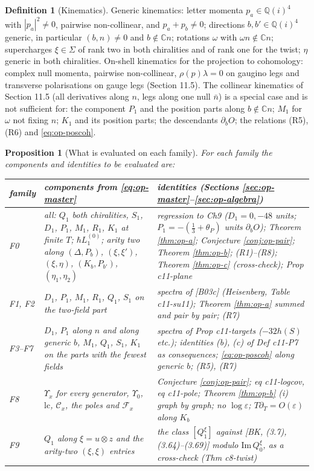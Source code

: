\documentclass[11pt]{article}
\numberwithin{equation}{section}
\theoremstyle{plain}
\newtheorem{proposition}[theorem]{Proposition}
\theoremstyle{definition}
\newtheorem{definition}[theorem]{Definition}
\newcommand{\lc}{\mathrm{lc}}
\newcommand{\Comp}{\mathcal C}
\begin{document}
\begin{definition}[Kinematics]
\label{def:op-kin}
Generic kinematics: letter momenta $p_a\in\mathbb Q(i)^4$ with $|p_a|^2\ne0$, pairwise non-collinear, and $p_a+p_b\ne0$; directions $b,b'\in\mathbb Q(i)^4$ generic, in particular $(b,n)\ne0$ and $b\notin\mathbb C n$; rotations $\omega$ with $\omega n\notin\mathbb Cn$; supercharges $\xi\in\Sigma$ of rank two in both chiralities and of rank one for the twist; $\eta$ generic in both chiralities. On-shell kinematics for the projection to cohomology: complex null momenta, pairwise non-collinear, $\rho(p)\lambda=0$ on gaugino legs and transverse polarisations on gauge legs (Section 11.5). The collinear kinematics of Section 11.5 (all derivatives along $n$, legs along one null $\bar n$) is a special case and is not sufficient for: the component $P_1$ and the position parts along $b\notin\mathbb Cn$; $M_1$ for $\omega$ not fixing $n$; $K_1$ and its position parts; the descendants $\partial_bO$; the relations (R5), (R6) and \eqref{eq:op-poscoh}.
\end{definition}

\begin{proposition}[What is evaluated on each family]
\label{prop:op-famtable}
For each family the components and identities to be evaluated are:
\begin{center}
\begin{tabular}{l|p{6.4cm}|p{6.4cm}}
family & components from \eqref{eq:op-master} & identities (Sections \ref{sec:op-master}--\ref{sec:op-algebra})\\
\hline
F0 & all: $Q_1$ both chiralities, $S_1$, $D_1$, $P_1$, $M_1$, $R_1$, $K_1$ at finite $T$; $\hbar L_1^{(0)}$; arity two along $(\Delta,P_b)$, $(\xi,\xi')$, $(\xi,\eta)$, $(K_b,P_{b'})$, $(\eta_1,\eta_2)$ & regression to Ch9 ($D_1=0,-48$ units; $P_1=-(\tfrac13+\theta_P)$ units $\partial_bO$); Theorem \ref{thm:op-a}; Conjecture \ref{conj:op-pair}; Theorem \ref{thm:op-b}; (R1)--(R8); Theorem \ref{thm:op-c} (cross-check); Prop c11-plane\\
F1, F2 & $D_1$, $P_1$, $M_1$, $R_1$, $Q_1$, $S_1$ on the two-field part & spectra of [B03c] (Heisenberg, Table c11-su11); Theorem \ref{thm:op-a} summed and pair by pair; (R7)\\
F3--F7 & $D_1$, $P_1$ along $n$ and along generic $b$, $M_1$, $Q_1$, $S_1$, $K_1$ on the parts with the fewest fields & spectra of Prop c11-targets ($-32h(S)$ etc.); identities (b), (c) of Def c11-P7 as consequences; \eqref{eq:op-poscoh} along generic $b$; (R5), (R7)\\
F8 & $\Upsilon_x$ for every generator, $\Upsilon_0$, $\lc$, $\Comp_x$, the poles and $\mathcal F_x$ & Conjecture \ref{conj:op-pair}; eq c11-logcov, eq c11-pole; Theorem \ref{thm:op-b} (i) graph by graph; no $\log\varepsilon$; $T\partial_T=O(\varepsilon)$ along $K_b$\\
F9 & $Q_1$ along $\xi=u\otimes z$ and the arity-two $(\xi,\xi)$ entries & the class $[Q^\xi_1]$ against [BK, (3.7), (3.64)--(3.69)] modulo $\mathrm{Im}\,Q^\xi_0$, as a cross-check (Thm c8-twist)
\end{tabular}
\end{center}
\end{proposition}
\end{document}
